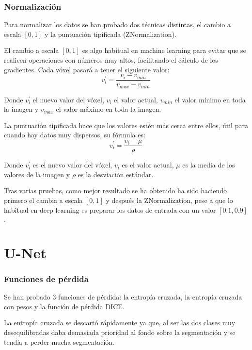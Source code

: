 \subsubsection{Normalización}

Para normalizar los datos se han probado dos técnicas distintas, el cambio a escala $[0,1]$ y la puntuación tipificada (ZNormalization).

El cambio a escala $[0,1]$ es algo habitual en machine learning para evitar que se realicen operaciones con números muy altos, facilitando el cálculo de los gradientes. Cada vóxel pasará a tener el siguiente valor:
\begin{equation}
v_i^{'} = \frac{v_i - v_{min}}{v_{max}-v_{min}}
\end{equation}

Donde $v_i^{'}$ el nuevo valor del vóxel, $v_i$ el valor actual, $v_{min}$ el valor mínimo en toda la imagen y $v_{max}$ el valor máximo en toda la imagen.

La puntuación tipificada hace que los valores estén más cerca entre ellos, útil para cuando hay datos muy dispersos, su fórmula es:
\begin{equation}
v_i^{'} = \frac{v_i - \mu}{\rho}
\end{equation}

Donde $v_i^{'}$ es el nuevo valor del vóxel, $v_i$ es el valor actual, $\mu$ es la media de los valores de la imagen y $\rho$ es la desviación estándar.

Tras varias pruebas, como mejor resultado se ha obtenido ha sido haciendo primero el cambia a escala $[0,1]$ y después la ZNormalization, pese a que lo habitual en deep learning es preparar los datos de entrada con un valor $[0.1,0.9]$.

\section{U-Net}\label{sec:unet_implementation}

\subsubsection{Funciones de pérdida}
Se han probado 3 funciones de pérdida: la entropía cruzada, la entropía cruzada con pesos y la función de pérdida DICE.

La entropía cruzada se descartó rápidamente ya que, al ser las dos clases muy desequilibradas daba demasiada prioridad al fondo sobre la segmentación y se tendía a perder mucha segmentación. 

